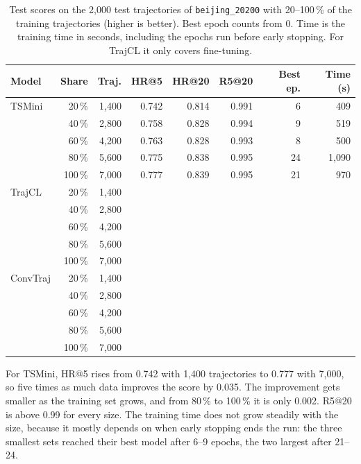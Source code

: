\begin{table}[htbp]
  \centering
  \small
  \setlength{\tabcolsep}{4pt}
  \begin{tabular}{|l|r|r|r|r|r|r|r|}
    \hline
    \textbf{Model} & \textbf{Share} & \textbf{Traj.} & \textbf{HR@5} &
    \textbf{HR@20} & \textbf{R5@20} & \textbf{Best ep.} & \textbf{Time (s)} \\
    \hline
    TSMini   & 20\,\%  & 1{,}400 & 0.742 & 0.814 & 0.991 & 6  & 409 \\
             & 40\,\%  & 2{,}800 & 0.758 & 0.828 & 0.994 & 9  & 519 \\
             & 60\,\%  & 4{,}200 & 0.763 & 0.828 & 0.993 & 8  & 500 \\
             & 80\,\%  & 5{,}600 & 0.775 & 0.838 & 0.995 & 24 & 1{,}090 \\
             & 100\,\% & 7{,}000 & 0.777 & 0.839 & 0.995 & 21 & 970 \\
    \hline
    TrajCL   & 20\,\%  & 1{,}400 &  &  &  &  &  \\
             & 40\,\%  & 2{,}800 &  &  &  &  &  \\
             & 60\,\%  & 4{,}200 &  &  &  &  &  \\
             & 80\,\%  & 5{,}600 &  &  &  &  &  \\
             & 100\,\% & 7{,}000 &  &  &  &  &  \\
    \hline
    ConvTraj & 20\,\%  & 1{,}400 &  &  &  &  &  \\
             & 40\,\%  & 2{,}800 &  &  &  &  &  \\
             & 60\,\%  & 4{,}200 &  &  &  &  &  \\
             & 80\,\%  & 5{,}600 &  &  &  &  &  \\
             & 100\,\% & 7{,}000 &  &  &  &  &  \\
    \hline
  \end{tabular}
  \caption{Test scores on the 2{,}000 test trajectories of \texttt{beijing\_20200}
  with 20--100\,\% of the training trajectories (higher is better). Best epoch
  counts from 0. Time is the training time in seconds, including the epochs run
  before early stopping. For TrajCL it only covers fine-tuning.}
  \label{tab:fraction-results}
\end{table}

For TSMini, HR@5 rises from 0.742 with 1{,}400 trajectories to 0.777 with 7{,}000,
so five times as much data improves the score by 0.035. The improvement gets
smaller as the training set grows, and from 80\,\% to 100\,\% it is only 0.002.
R5@20 is above 0.99 for every size. The training time does not grow steadily with
the size, because it mostly depends on when early stopping ends the run: the three
smallest sets reached their best model after 6--9 epochs, the two largest after
21--24.

